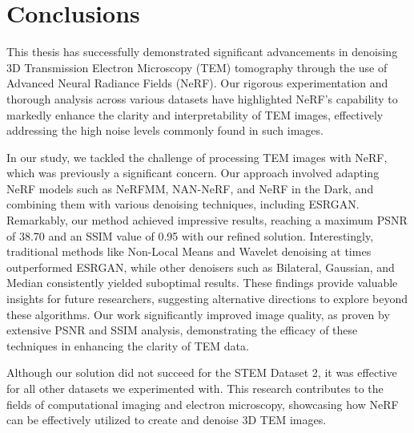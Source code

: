 \chapter{Conclusions}\label{ch:Conclusions}
This thesis has successfully demonstrated significant advancements in denoising 3D Transmission Electron Microscopy (TEM) tomography through the use of Advanced Neural Radiance Fields (NeRF). Our rigorous experimentation and thorough analysis across various datasets have highlighted NeRF's capability to markedly enhance the clarity and interpretability of TEM images, effectively addressing the high noise levels commonly found in such images.

\vspace{10pt}
In our study, we tackled the challenge of processing TEM images with NeRF, which was previously a significant concern. Our approach involved adapting NeRF models such as NeRFMM, NAN-NeRF, and NeRF in the Dark, and combining them with various denoising techniques, including ESRGAN. Remarkably, our method achieved impressive results, reaching a maximum PSNR of 38.70 and an SSIM value of 0.95 with our refined solution. Interestingly, traditional methods like Non-Local Means and Wavelet denoising at times outperformed ESRGAN, while other denoisers such as Bilateral, Gaussian, and Median consistently yielded suboptimal results. These findings provide valuable insights for future researchers, suggesting alternative directions to explore beyond these algorithms. Our work significantly improved image quality, as proven by extensive PSNR and SSIM analysis, demonstrating the efficacy of these techniques in enhancing the clarity of TEM data.

\vspace{10pt}
Although our solution did not succeed for the STEM Dataset 2, it was effective for all other datasets we experimented with. This research contributes to the fields of computational imaging and electron microscopy, showcasing how NeRF can be effectively utilized to create and denoise 3D TEM images.
